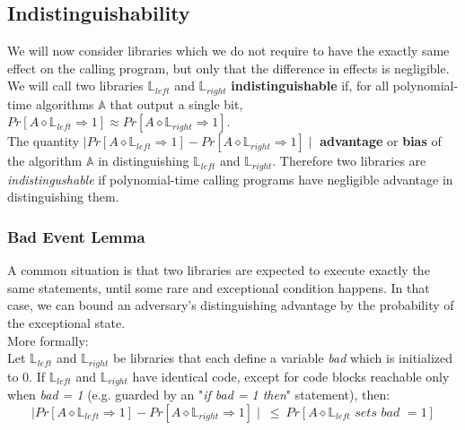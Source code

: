 \documentclass{article}
\begin{document}
\begin{adjustwidth}{2em}{}
		\subsection{Indistinguishability}
			\begin{adjustwidth}{2em}{4em}
				We will now consider libraries which we do not require to have the exactly same effect on the calling program, but only that the difference in effects is negligible. We will call two libraries $\mathbb{L}_{left}$ and $\mathbb{L}_{right}$ \textbf{indistinguishable} if, for all polynomial-time algorithms $\mathbb{A}$ that output a single bit, $Pr[A \diamond \mathbb{L}_{left} \Rightarrow 1] \approx Pr[A \diamond \mathbb{L}_{right} \Rightarrow 1]$. \\
				The quantity $\mid Pr[A \diamond \mathbb{L}_{left} \Rightarrow 1] - Pr[A \diamond \mathbb{L}_{right} \Rightarrow 1] \mid$ \textbf{advantage} or \textbf{bias} of the algorithm $\mathbb{A}$ in distinguishing $\mathbb{L}_{left}$ and $\mathbb{L}_{right}$. Therefore two libraries are \textit{indistingushable} if polynomial-time calling programs have negligible advantage in distinguishing them.
				\subsubsection{Bad Event Lemma}
					\begin{adjustwidth}{2em}{}
						A common situation is that two libraries are expected to execute exactly the same statements, until some rare and exceptional condition happens. In that case, we can bound an adversary's distinguishing advantage by the probability of the exceptional state. \\
						More formally: \\
						Let $\mathbb{L}_{left}$ and $\mathbb{L}_{right}$ be libraries that each define a variable \textit{bad} which is initialized to 0. If $\mathbb{L}_{left}$ and $\mathbb{L}_{right}$ have identical code, except for code blocks reachable only when \textit{bad = 1} (e.g. guarded by an "\textit{if bad = 1 then}" statement), then:
						\[
							\mid Pr[A \diamond \mathbb{L}_{left} \Rightarrow 1] - Pr[A \diamond \mathbb{L}_{right} \Rightarrow 1] \mid \ \leq \ Pr[A \diamond \mathbb{L}_{left} \textit{ sets bad } = 1]
						\]
					\end{adjustwidth}
			\end{adjustwidth}

\end{adjustwidth}
\end{document}
